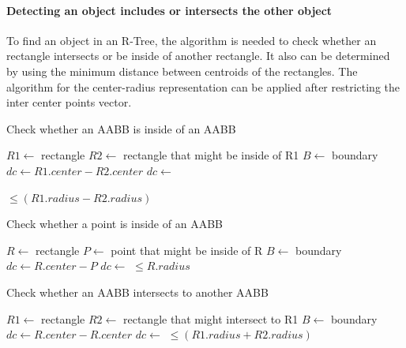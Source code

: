 \documentclass[10pt,letterpaper,twocolumn]{article}
\begin{document}
\paragraph{Detecting an object includes or intersects the other object}

To find an object in an R-Tree, the algorithm is needed to check whether an
rectangle intersects or be inside of another rectangle.
It also can be determined by using the minimum distance between centroids of the
rectangles.
The algorithm for the center-radius representation can be applied after
restricting the inter center points vector.

\begin{algorithm}
    \caption{Check whether an AABB is inside of an AABB}
    \begin{algorithmic}
        \State $R1 \gets$ rectangle
        \State $R2 \gets$ rectangle that might be inside of R1
        \State $B  \gets$ boundary
            \State $dc \gets R1.center - R2.center$
            \State $dc \gets$ 

            \State \Return {} $\leq (R1.radius - R2.radius)$
        \EndFunction
     \end{algorithmic}
\end{algorithm}

\begin{algorithm}
    \caption{Check whether a point is inside of an AABB}
    \begin{algorithmic}
        \State $R \gets$ rectangle
        \State $P \gets$ point that might be inside of R
        \State $B \gets$ boundary
            \State $dc \gets R.center - P$
            \State $dc \gets$ 
            \State \Return {} $\leq R.radius$
        \EndFunction
     \end{algorithmic}
\end{algorithm}

\begin{algorithm}
    \caption{Check whether an AABB intersects to another AABB}
    \begin{algorithmic}
        \State $R1 \gets$ rectangle
        \State $R2 \gets$ rectangle that might intersect to R1
        \State $B  \gets$ boundary
            \State $dc \gets R.center - R.center$
            \State $dc \gets$ 
            \State \Return {} $\leq (R1.radius + R2.radius)$
        \EndFunction
     \end{algorithmic}
\end{algorithm}
\end{document}
